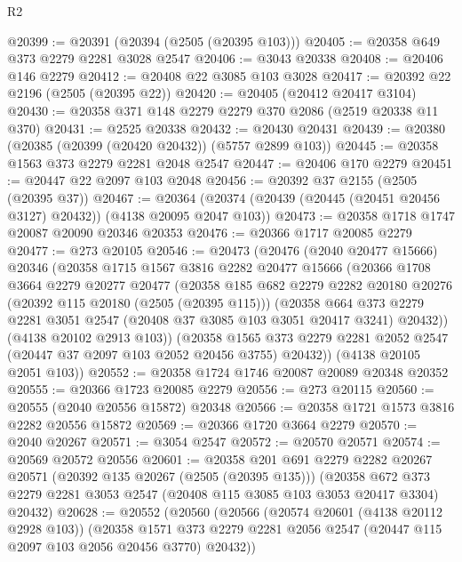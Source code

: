 \begin{lexlean}{R2}
\begin{coremodule}
@20399 := @20391 (@20394 (@2505 (@20395 @103)))
@20405 := @20358 @649 @373 @2279 @2281 @3028 @2547
@20406 := @3043 @20338
@20408 := @20406 @146 @2279
@20412 := @20408 @22 @3085 @103 @3028
@20417 := @20392 @22 @2196 (@2505 (@20395 @22))
@20420 := @20405 (@20412 @20417 @3104)
@20430 := @20358 @371 @148 @2279 @2279 @370 @2086 (@2519 @20338 @11 @370)
@20431 := @2525 @20338
@20432 := @20430 @20431
@20439 := @20380 (@20385 (@20399 (@20420 @20432)) (@5757 @2899 @103))
@20445 := @20358 @1563 @373 @2279 @2281 @2048 @2547
@20447 := @20406 @170 @2279
@20451 := @20447 @22 @2097 @103 @2048
@20456 := @20392 @37 @2155 (@2505 (@20395 @37))
@20467 := @20364 (@20374 (@20439 (@20445 (@20451 @20456 @3127) @20432)) (@4138 @20095 @2047 @103))
@20473 := @20358 @1718 @1747 @20087 @20090 @20346 @20353
@20476 := @20366 @1717 @20085 @2279
@20477 := @273 @20105
@20546 := @20473
    (@20476
      (@2040 @20477 @15666)
      @20346
      (@20358
        @1715
        @1567
        @3816
        @2282
        @20477
        @15666
        (@20366
          @1708
          @3664
          @2279
          @20277
          @20477
          (@20358
            @185
            @682
            @2279
            @2282
            @20180
            @20276
            (@20392 @115 @20180 (@2505 (@20395 @115)))
            (@20358
              @664
              @373
              @2279
              @2281
              @3051
              @2547
              (@20408 @37 @3085 @103 @3051 @20417 @3241)
              @20432))
          (@4138 @20102 @2913 @103))
        (@20358
          @1565
          @373
          @2279
          @2281
          @2052
          @2547
          (@20447 @37 @2097 @103 @2052 @20456 @3755)
          @20432))
      (@4138 @20105 @2051 @103))
@20552 := @20358 @1724 @1746 @20087 @20089 @20348 @20352
@20555 := @20366 @1723 @20085 @2279
@20556 := @273 @20115
@20560 := @20555 (@2040 @20556 @15872) @20348
@20566 := @20358 @1721 @1573 @3816 @2282 @20556 @15872
@20569 := @20366 @1720 @3664 @2279
@20570 := @2040 @20267
@20571 := @3054 @2547
@20572 := @20570 @20571
@20574 := @20569 @20572 @20556
@20601 := @20358
    @201
    @691
    @2279
    @2282
    @20267
    @20571
    (@20392 @135 @20267 (@2505 (@20395 @135)))
    (@20358 @672 @373 @2279 @2281 @3053 @2547 (@20408 @115 @3085 @103 @3053 @20417 @3304) @20432)
@20628 := @20552
    (@20560
      (@20566
        (@20574 @20601 (@4138 @20112 @2928 @103))
        (@20358
          @1571
          @373
          @2279
          @2281
          @2056
          @2547
          (@20447 @115 @2097 @103 @2056 @20456 @3770)
          @20432))

\end{coremodule}
\end{lexlean}
